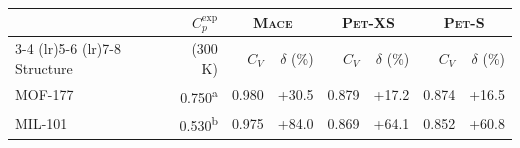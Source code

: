 \begin{tabular}{l r rr rr rr}
\toprule
& $C_p^{\mathrm{exp}}$ & \multicolumn{2}{c}{\textsc{Mace}} & \multicolumn{2}{c}{\textsc{Pet}-XS} & \multicolumn{2}{c}{\textsc{Pet}-S} \\
\cmidrule(lr){3-4} \cmidrule(lr){5-6} \cmidrule(lr){7-8}
       Structure  &           (300 K)  &             $C_V$  &     $\delta$ (\%)  &             $C_V$  &     $\delta$ (\%)  &             $C_V$  &     $\delta$ (\%) \\ 
\midrule
         MOF-177  &  0.750\textsuperscript{a}  &             0.980  &             +30.5  &             0.879  &             +17.2  &             0.874  &             +16.5 \\ 
         MIL-101  &  0.530\textsuperscript{b}  &             0.975  &             +84.0  &             0.869  &             +64.1  &             0.852  &             +60.8 \\ 
\bottomrule
\end{tabular}
